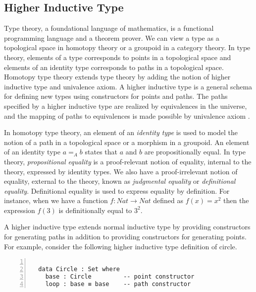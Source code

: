 \documentclass[sigplan,10pt]{acmart}
\begin{document}
\subsection{Higher Inductive Type}
\label{sec:sec2.2}

Type theory, a foundational language of mathematics, is a functional programming language and a theorem prover. We can view a type as a topological space in homotopy theory or a groupoid in a category theory. In type theory, elements of a type corresponds to points in a topological space and elements of an identity type corresponds to paths in a topological space. Homotopy type theory extends type theory by adding the notion of higher inductive type and univalence axiom. A higher inductive type is a general schema for defining new types using constructors for points and paths. The paths specified by a higher inductive type are realized by equivalences in the universe, and the mapping of paths to equivalences is made possible by univalence axiom \cite{HoTT-2013}.

In homotopy type theory, an element of an \emph{identity type} is used to model the notion of a path in a topological space or a morphism in a groupoid. An element of an identity type $a =_A b$ states that $a$ and $b$ are propositionally equal. In type theory, \emph{propositional equality} is a proof-relevant notion of equality, internal to the theory, expressed by identity types. We also have a proof-irrelevant notion of equality, external to the theory, known as \emph{judgmental equality} or \emph{definitional equality}. Definitional equality is used to express equality by definition. For instance, when we have a function $f : Nat \rightarrow Nat$ defined as $f(x) = x^2$ then the expression $f(3)$ is definitionally equal to $3^2$. 

A higher inductive type extends normal inductive type by providing constructors for generating paths in addition to providing constructors for generating points. For example, consider the following higher inductive type definition of circle.

\begin{center}
\begingroup
\fontsize{7pt}{9pt}\selectfont
\begin{Verbatim}[frame = lines, rulecolor=\color{blue}, numbers = left, numbersep = 0pt]

  data Circle : Set where
    base : Circle         -- point constructor
    loop : base ≡ base    -- path constructor

\end{Verbatim}
\endgroup
\end{center}
\end{document}
